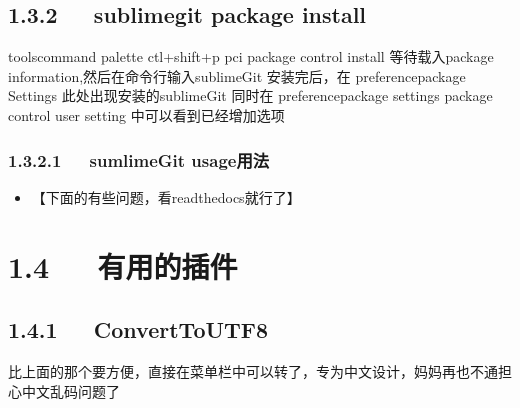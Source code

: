 \documentclass[letterpaper,12pt,english]{sphinxmanual}
\begin{document}
\subsection{1.3.2   sublimegit package install}
\label{\detokenize{001software/001install/sublime:sublimegit-package-install}}
\begin{sphinxVerbatim}[commandchars=\\\{\}]
tools\PYGZhy{}command palette ctl+shift+p
pci package control install
等待载入package information,然后在命令行输入sublimeGit
安装完后，在
preference\PYGZhy{}\PYGZgt{}package Settings\PYGZhy{}\PYGZgt{} 此处出现安装的sublimeGit
同时在
preference\PYGZhy{}\PYGZgt{}package settings\PYGZhy{}\PYGZgt{} package control \PYGZhy{}\PYGZgt{} user setting 中可以看到已经增加选项
\end{sphinxVerbatim}


\subsubsection{1.3.2.1   sumlimeGit usage用法}
\label{\detokenize{001software/001install/sublime:sumlimegit-usage}}
\begin{itemize}
\item {} 
【下面的有些问题，看readthedocs就行了】

\end{itemize}





\section{1.4   有用的插件}
\label{\detokenize{001software/001install/sublime:id3}}


\subsection{1.4.1   ConvertToUTF8}
\label{\detokenize{001software/001install/sublime:converttoutf8}}
比上面的那个要方便，直接在菜单栏中可以转了，专为中文设计，妈妈再也不通担心中文乱码问题了
\end{document}

